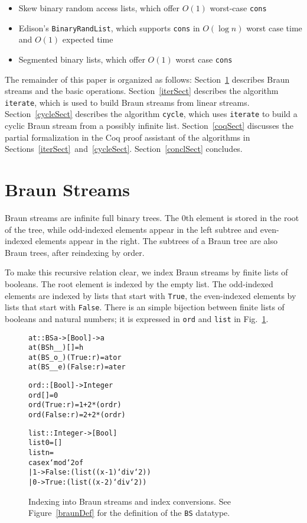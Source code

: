 \documentclass[envcountsect]{llncs}
\begin{document}
\begin{itemize}
\item Skew binary random access lists, which offer $O(1)$ worst-case {\tt cons} \cite{okasakiSkewLists}
\item Edison's \verb|BinaryRandList|, which supports {\tt cons} in $O(\log n)$ worst case time and $O(1)$ expected time \cite{edison,holtersThesis}
\item Segmented binary lists, which offer $O(1)$ worst case {\tt cons} \cite{okasakiThesis}
\end{itemize}


The remainder of this paper is organized as follows: 
Section~\ref{braunSect} describes Braun streams and the basic operations.
Section~\ref{iterSect} describes the algorithm {\tt iterate}, which is used to build Braun streams from linear streams.
Section~\ref{cycleSect} describes the algorithm {\tt cycle}, which uses {\tt iterate} to build a cyclic Braun stream from a possibly infinite list.
Section~\ref{coqSect} discusses the partial formalization in the Coq proof assistant of the algorithms in Sections~\ref{iterSect}~and~\ref{cycleSect}.
Section~\ref{conclSect} concludes.

\section{Braun Streams}
\label{braunSect}

Braun streams are infinite full binary trees.
The $0$th element is stored in the root of the tree, while odd-indexed elements appear in the left subtree and even-indexed elements appear in the right.
The subtrees of a Braun tree are also Braun trees, after reindexing by order.

To make this recursive relation clear, we index Braun streams by finite lists of booleans.
The root element is indexed by the empty list.
The odd-indexed elements are indexed by lists that start with \verb|True|, the even-indexed elements by lists that start with \verb|False|.
There is an simple bijection between finite lists of booleans and natural numbers;
it is expressed in \verb|ord| and \verb|list| in Fig.~\ref{basicCode}.

\begin{figure}
\begin{alltt}
at :: BS a -> [Bool] -> a
at (BS h _ _) [] = h
at (BS _ o _) (True:r) = at o r
at (BS _ _ e) (False:r) = at e r

ord :: [Bool] -> Integer
ord [] = 0
ord (True:r) = 1 + 2*(ord r)
ord (False:r) = 2 + 2*(ord r)

list :: Integer -> [Bool]
list 0 = []
list n = 
    case x `mod` 2 of
      | 1 -> False:(list ((x-1)`div`2))
      | 0 -> True:(list ((x-2)`div`2))
\end{alltt}
\caption{Indexing into Braun streams and index conversions.
See Figure~\ref{braunDef} for the definition of the {\tt BS} datatype.}
\label{basicCode}
\end{figure}
\end{document}
